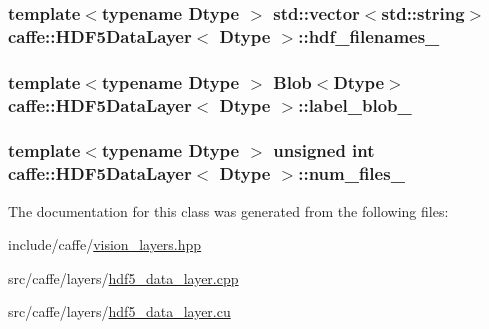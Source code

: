 \hypertarget{classcaffe_1_1_h_d_f5_data_layer_ae255f1e97fc8140bfeb7e3325f431f5a}{
\subsubsection[{hdf\+\_\+filenames\+\_\+}]{\setlength{\rightskip}{0pt plus 5cm}template$<$typename Dtype $>$ std\+::vector$<$std\+::string$>$ {\bf caffe\+::\+H\+D\+F5\+Data\+Layer}$<$ Dtype $>$\+::hdf\+\_\+filenames\+\_\+\hspace{0.3cm}{\ttfamily [protected]}}}\label{classcaffe_1_1_h_d_f5_data_layer_ae255f1e97fc8140bfeb7e3325f431f5a}
\hypertarget{classcaffe_1_1_h_d_f5_data_layer_a15f4061897306968bb41c9300ab9250b}{
\subsubsection[{label\+\_\+blob\+\_\+}]{\setlength{\rightskip}{0pt plus 5cm}template$<$typename Dtype $>$ {\bf Blob}$<$Dtype$>$ {\bf caffe\+::\+H\+D\+F5\+Data\+Layer}$<$ Dtype $>$\+::label\+\_\+blob\+\_\+\hspace{0.3cm}{\ttfamily [protected]}}}\label{classcaffe_1_1_h_d_f5_data_layer_a15f4061897306968bb41c9300ab9250b}
\hypertarget{classcaffe_1_1_h_d_f5_data_layer_aa6154c78cd3f375f1bba8dc544362e59}{
\subsubsection[{num\+\_\+files\+\_\+}]{\setlength{\rightskip}{0pt plus 5cm}template$<$typename Dtype $>$ unsigned int {\bf caffe\+::\+H\+D\+F5\+Data\+Layer}$<$ Dtype $>$\+::num\+\_\+files\+\_\+\hspace{0.3cm}{\ttfamily [protected]}}}\label{classcaffe_1_1_h_d_f5_data_layer_aa6154c78cd3f375f1bba8dc544362e59}


The documentation for this class was generated from the following files\+:\begin{DoxyCompactItemize}
\item 
include/caffe/\hyperlink{vision__layers_8hpp}{vision\+\_\+layers.\+hpp}\item 
src/caffe/layers/\hyperlink{hdf5__data__layer_8cpp}{hdf5\+\_\+data\+\_\+layer.\+cpp}\item 
src/caffe/layers/\hyperlink{hdf5__data__layer_8cu}{hdf5\+\_\+data\+\_\+layer.\+cu}\end{DoxyCompactItemize}

